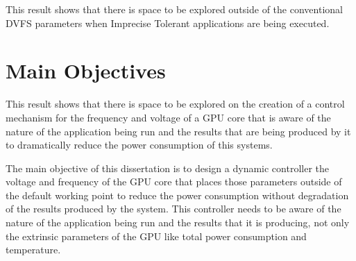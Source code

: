 This result shows that there is space to be explored outside of the conventional DVFS parameters when Imprecise Tolerant applications are being executed.


\section{Main Objectives}
\label{section:objectives}




This result shows that there is space to be explored on the creation of a control mechanism for the frequency and voltage of a GPU core that is aware of the nature of the application being run and the results that are being produced by it to dramatically reduce the power consumption of this systems.

The main objective of this dissertation is to design a dynamic controller the voltage and frequency of the GPU core that places those parameters outside of the default working point to reduce the power consumption without degradation of the results produced by the system. This controller needs to be aware of the nature of the application being run and the results that it is producing, not only the extrinsic parameters of the GPU like total power consumption and temperature.

